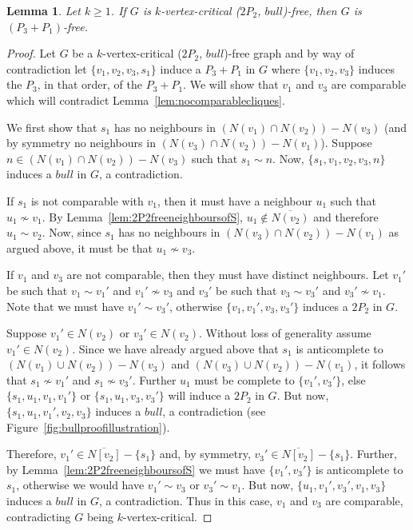 \documentclass[11pt]{article}
\newtheorem{lemma}[theorem]{Lemma}
\theoremstyle{definition}
\begin{document}
\begin{lemma}\label{lem:2P2bullP3P1fee}
Let $k\ge 1$. If $G$ is $k$-vertex-critical ($2P_2$, $bull$)-free, then $G$ is $(P_3+ P_1)$-free.
\end{lemma}
\begin{proof}
Let $G$ be a $k$-vertex-critical ($2P_2$, $bull$)-free graph and by way of contradiction let $\{v_1,v_2,v_3,s_1\}$ induce a $P_3+P_1$ in $G$ where $\{v_1,v_2,v_3\}$ induces the $P_3$, in that order, of the $P_3+P_1$. We will show that $v_1$ and $v_3$ are comparable which will contradict Lemma~\ref{lem:nocomparablecliques}.


We first show that $s_1$ has no neighbours in $(N(v_1)\cap N(v_2))-N(v_3)$  (and by symmetry no neighbours in $(N(v_3)\cap N(v_2))-N(v_1)$). Suppose $n\in (N(v_1)\cap N(v_2))-N(v_3)$ such that $s_1\sim n$. Now, $\{s_1,v_1,v_2,v_3,n\}$ induces a $bull$ in $G$, a contradiction. 

If $s_1$ is not comparable with $v_1$, then it must have a neighbour $u_1$ such that $u_1\nsim v_1$. By Lemma~\ref{lem:2P2freeneighboursofS}, $u_1\not\in \overline{N(v_2)}$ and therefore $u_1\sim v_2$. Now, since $s_1$ has no neighbours in $(N(v_3)\cap N(v_2))-N(v_1)$ as argued above, it must be that $u_1\nsim v_3$. %

If $v_1$ and $v_3$ are not comparable, then they must have distinct neighbours. Let $v_1'$ be such that $v_1\sim v_1'$ and $v_1'\nsim v_3$ and $v_3'$ be such that $v_3\sim v_3'$ and $v_3'\nsim v_1$. Note that we must have $v_1'\sim v_3'$, otherwise $\{v_1,v_1',v_3,v_3'\}$ induces a $2P_2$ in $G$.

Suppose $v_1'\in N(v_2)$ or $v_3'\in N(v_2)$. Without loss of generality assume $v_1'\in N(v_2)$. Since we have already argued above that $s_1$ is anticomplete to $(N(v_1)\cup N(v_2))-N(v_3)$ and $(N(v_3)\cup N(v_2))-N(v_1)$, it follows that $s_1\nsim v_1'$ and $s_1\nsim v_3'$. Further $u_1$ must be complete to $\{v_1',v_3'\}$, else $\{s_1,u_1,v_1,v_1'\}$ or $\{s_1,u_1,v_3,v_3'\}$ will induce a $2P_2$ in $G$. But now, $\{s_1,u_1,v_1',v_2,v_3\}$ induces a $bull$, a contradiction (see Figure~\ref{fig:bullproofillustration}). 

Therefore,  $v_1'\in \overline{N[v_2]}-\{s_1\}$ and, by symmetry, $v_3'\in \overline{N[v_2]}-\{s_1\}$. Further, by Lemma~\ref{lem:2P2freeneighboursofS} we must have $\{v_1',v_3'\}$ is anticomplete to $s_1$, otherwise we would have $v_1'\sim v_3$ or $v_3'\sim v_1$.  But now, $\{u_1,v_1',v_3',v_1,v_3\}$ induces a $bull$ in $G$, a contradiction. Thus in this case, $v_1$ and $v_3$ are comparable, contradicting $G$ being $k$-vertex-critical.

\end{proof}
\end{document}
